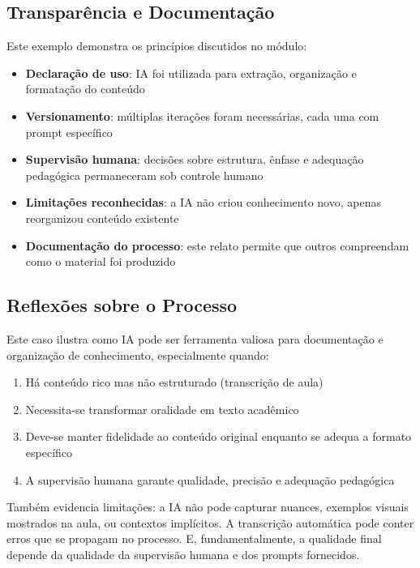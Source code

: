 \documentclass[
  a4paper,
]{book}
\providecommand{\tightlist}{%
  \setlength{\itemsep}{0pt}\setlength{\parskip}{0pt}}\usepackage{longtable,booktabs,array}
\begin{document}
\subsection{Transparência e
Documentação}\label{transparuxeancia-e-documentauxe7uxe3o}

Este exemplo demonstra os princípios discutidos no módulo:

\begin{itemize}
\tightlist
\item
  \textbf{Declaração de uso}: IA foi utilizada para extração,
  organização e formatação do conteúdo
\item
  \textbf{Versionamento}: múltiplas iterações foram necessárias, cada
  uma com prompt específico
\item
  \textbf{Supervisão humana}: decisões sobre estrutura, ênfase e
  adequação pedagógica permaneceram sob controle humano
\item
  \textbf{Limitações reconhecidas}: a IA não criou conhecimento novo,
  apenas reorganizou conteúdo existente
\item
  \textbf{Documentação do processo}: este relato permite que outros
  compreendam como o material foi produzido
\end{itemize}

\subsection{Reflexões sobre o
Processo}\label{reflexuxf5es-sobre-o-processo}

Este caso ilustra como IA pode ser ferramenta valiosa para documentação
e organização de conhecimento, especialmente quando:

\begin{enumerate}
\def\labelenumi{\arabic{enumi}.}
\tightlist
\item
  Há conteúdo rico mas não estruturado (transcrição de aula)
\item
  Necessita-se transformar oralidade em texto acadêmico
\item
  Deve-se manter fidelidade ao conteúdo original enquanto se adequa a
  formato específico
\item
  A supervisão humana garante qualidade, precisão e adequação pedagógica
\end{enumerate}

Também evidencia limitações: a IA não pode capturar nuances, exemplos
visuais mostrados na aula, ou contextos implícitos. A transcrição
automática pode conter erros que se propagam no processo. E,
fundamentalmente, a qualidade final depende da qualidade da supervisão
humana e dos prompts fornecidos.
\end{document}
